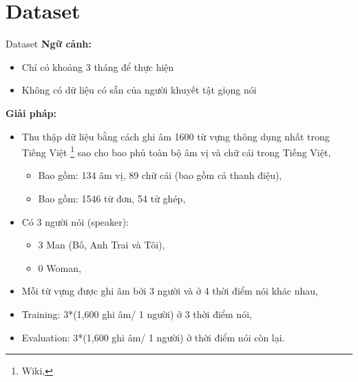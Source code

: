 \documentclass[10pt,a4paper,openany]{beamer}
\begin{document}
	\section{Dataset}
	\def\MyScale{.2}
	\def\MySpace{0cm}
	\begin{frame}{Dataset}
		\textbf{Ngữ cảnh:} \\  \pause
		\begin{itemize}
			\item Chỉ có khoảng 3 tháng để thực hiện \pause
			\item Không có dữ liệu có sẵn của người khuyết tật giọng nói \pause
		\end{itemize}
		\textbf{Giải pháp:} \pause
		\begin{itemize}
			\item Thu thập dữ liệu bằng cách ghi âm 1600 từ vựng thông dụng nhất trong Tiếng Việt \footnote{ Wiki, } sao cho bao phủ toàn bộ âm vị và chữ cái trong Tiếng Việt, \pause
			\begin{itemize}
				\item Bao gồm: 134 âm vị, 89 chữ cái (bao gồm cả thanh điệu),  \pause
				\item Bao gồm: 1546 từ đơn, 54 từ ghép, \pause
			\end{itemize}			
			\item Có 3 người nói (speaker): \pause
			\begin{itemize}
				\item 3 Man (Bố, Anh Trai và Tôi),
				\item 0 Woman,\pause
			\end{itemize} 
			\item Mỗi từ vựng được ghi âm bởi 3 người và ở 4 thời điểm nói khác nhau, \pause
			\item Training: 3*(1,600 ghi âm/ 1 người) ở 3 thời điểm nói, \pause
			\item Evaluation: 3*(1,600 ghi âm/ 1 người) ở thời điểm nói còn lại.
		\end{itemize}
	\end{frame}
	
\end{document}
